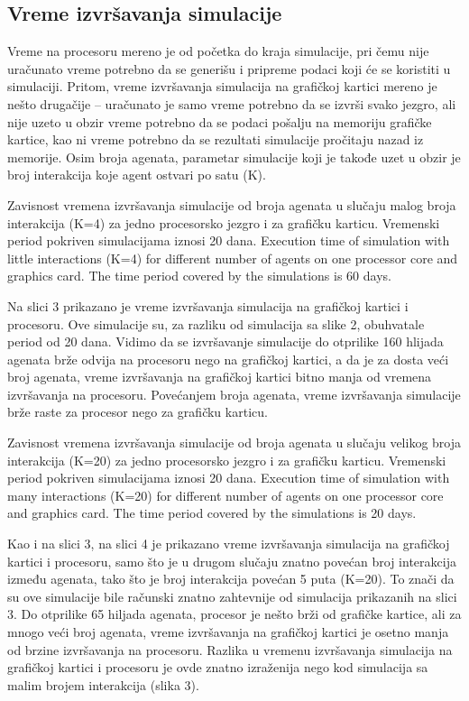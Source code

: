 \subsection{Vreme izvršavanja simulacije}

Vreme na procesoru mereno je od početka do kraja simulacije, pri čemu nije uračunato vreme potrebno da se generišu i pripreme podaci koji će se koristiti u simulaciji. Pritom, vreme izvršavanja simulacija na grafičkoj kartici mereno je nešto drugačije -- uračunato je samo vreme potrebno da se izvrši svako jezgro, ali nije uzeto u obzir vreme potrebno da se podaci pošalju na memoriju grafičke kartice, kao ni vreme potrebno da se rezultati simulacije pročitaju nazad iz memorije. Osim broja agenata, parametar simulacije koji je takođe uzet u obzir je broj interakcija koje agent ostvari po satu (K).

    {Zavisnost vremena izvršavanja simulacije od broja agenata u slučaju malog broja interakcija (K=4) za jedno procesorsko jezgro i za grafičku karticu. Vremenski period pokriven simulacijama iznosi 20 dana. }
    {Execution time of simulation with little interactions (K=4) for different number of agents on one processor core and graphics card. The time period covered by the simulations is 60 days.}

Na slici 3 prikazano je vreme izvršavanja simulacija na grafičkoj kartici i procesoru. Ove simulacije su, za razliku od simulacija sa slike 2, obuhvatale period od 20 dana. Vidimo da se izvršavanje simulacije do otprilike 160 hlijada agenata brže odvija na procesoru nego na grafičkoj kartici, a da je za dosta veći broj agenata, vreme izvršavanja na grafičkoj kartici bitno manja od vremena izvršavanja na procesoru. Povećanjem broja agenata, vreme izvršavanja simulacije brže raste za procesor nego za grafičku karticu.

    {Zavisnost vremena izvršavanja simulacije od broja agenata u slučaju velikog broja interakcija (K=20) za jedno procesorsko jezgro i za grafičku karticu. Vremenski period pokriven simulacijama iznosi 20 dana.}
    {Execution time of simulation with many interactions (K=20) for different number of agents on one processor core and graphics card. The time period covered by the simulations is 20 days.}

Kao i na slici 3, na slici 4 je prikazano vreme izvršavanja simulacija na grafičkoj kartici i procesoru, samo što je u drugom slučaju znatno povećan broj interakcija između agenata, tako što je broj interakcija povećan 5 puta (K=20). To znači da su ove simulacije bile računski znatno zahtevnije od simulacija prikazanih na slici 3. Do otprilike 65 hiljada agenata, procesor je nešto brži od grafičke kartice, ali za mnogo veći broj agenata, vreme izvršavanja na grafičkoj kartici je osetno manja od brzine izvršavanja na procesoru. Razlika u vremenu izvršavanja simulacija na grafičkoj kartici i procesoru je ovde znatno izraženija nego kod simulacija sa malim brojem interakcija (slika 3).

